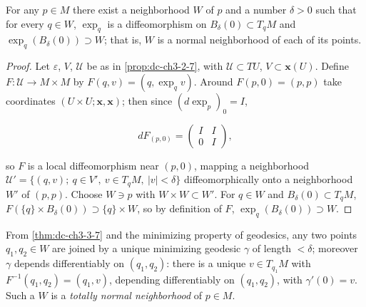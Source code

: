 \begin{theorem}
  \label{thm:dc-ch3-3-7}


  For any $p\in M$ there exist a neighborhood $W$ of $p$ and a number $\delta>0$
  such that for every $q\in W$, $\exp_q$ is a diffeomorphism on
  $B_\delta(0)\subset T_qM$ and $\exp_q(B_\delta(0))\supset W$; that is, $W$ is a
  normal neighborhood of each of its points.
\end{theorem}
\begin{proof}
  \sketch

  Let $\varepsilon$, $V$, $\mathcal{U}$ be as in \cref{prop:dc-ch3-2-7}, with
  $\mathcal{U}\subset TU$, $V\subset\mathbf{x}(U)$. Define $F:\mathcal{U}\to M\times M$
  by $F(q,v)=(q,\exp_q v)$. Around $F(p,0)=(p,p)$ take coordinates
  $(U\times U;\mathbf{x},\mathbf{x})$; then since $(d\exp_p)_0=I$,

  $$
  dF_{(p,0)}=\begin{pmatrix}I & I\\ 0 & I\end{pmatrix},
  $$

  so $F$ is a local diffeomorphism near $(p,0)$, mapping a neighborhood
  $\mathcal{U}'=\{(q,v);\ q\in V',\ v\in T_qM,\ |v|<\delta\}$ diffeomorphically onto
  a neighborhood $W'$ of $(p,p)$. Choose $W\ni p$ with $W\times W\subset W'$. For
  $q\in W$ and $B_\delta(0)\subset T_qM$, $F(\{q\}\times B_\delta(0))\supset\{q\}\times W$,
  so by definition of $F$, $\exp_q(B_\delta(0))\supset W$.
\end{proof}

\begin{remark}
  \label{rem:dc-ch3-3-8}
  From \cref{thm:dc-ch3-3-7} and the minimizing property of geodesics, any two points
  $q_1,q_2\in W$ are joined by a unique minimizing geodesic $\gamma$ of length
  $<\delta$; moreover $\gamma$ depends differentiably on $(q_1,q_2)$: there is a
  unique $v\in T_{q_1}M$ with $F^{-1}(q_1,q_2)=(q_1,v)$, depending differentiably on
  $(q_1,q_2)$, with $\gamma'(0)=v$. Such a $W$ is a \emph{totally normal neighborhood} of
  $p\in M$.
\end{remark}


